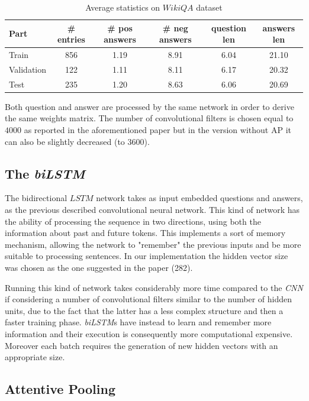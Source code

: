 \documentclass[11pt,a4paper]{article}
\begin{document}
\begin{table}[h]
  \centering
  \begin{tabular}{|l|c|c|c|c|c|}
    \hline
    \bf Part & \bf \# entries & \bf \# pos answers & \bf \# neg answers & \bf question len & \bf answers len \\
    \hline
    Train & 856 & 1.19 & 8.91 & 6.04 & 21.10 \\
    Validation & 122 & 1.11 & 8.11 & 6.17 & 20.32 \\
    Test & 235 & 1.20 & 8.63 & 6.06 & 20.69 \\
    \hline
  \end{tabular}
  \caption{Average statistics on $WikiQA$ dataset}
  \label{table:statswiki}
\end{table}

Both question and answer are processed by the same network in order to derive the same weights matrix. The number of convolutional filters is chosen equal to $4000$ as reported in the aforementioned paper but in the version without AP it can also be slightly decreased (to $3600$).

\subsection{The \textit{biLSTM}}
The bidirectional $LSTM$ network takes as input embedded questions and answers, as the previous described convolutional neural network. This kind of network has the ability of processing the sequence in two directions, using both the information about past and future tokens.
This implements a sort of memory mechanism, allowing the network to "remember" the previous inputs and be more suitable to processing sentences.
In our implementation the hidden vector size was chosen as the one suggested in the paper (282).

Running this kind of network takes considerably more time compared to the \textit{CNN} if considering a number of convolutional filters similar to the number of hidden units, due to the fact that the latter has a less complex structure and then a faster training phase. \textit{biLSTM}s have instead to learn and remember more information and their execution is consequently more computational expensive. Moreover each batch requires the generation of new hidden vectors with an appropriate size.

\subsection{Attentive Pooling}
\end{document}
